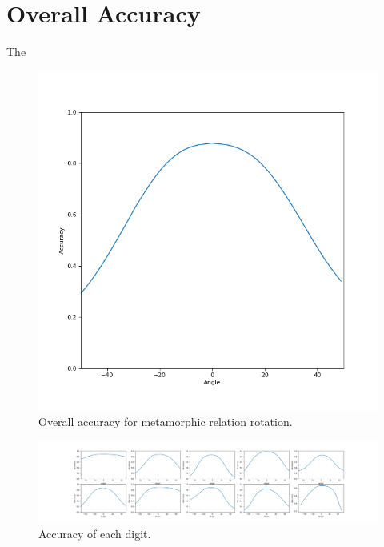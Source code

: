 \section{Overall Accuracy}
The 
    \begin{figure}[!htb]
        \begin{center}
          \includegraphics[scale=0.6]{chapters/results/CNN/Rotate/acc.png}
          \caption{Overall accuracy for metamorphic relation rotation.}
          \label{fig:Rotate 1}
        \end{center}
    \end{figure}
    
\clearpage
    \begin{figure}[!htb]
    \centering
      \includegraphics[width=\linewidth]{chapters/results/CNN/Rotate/accAll.png}
      \caption{Accuracy of each digit.}
      \label{fig: Shading}
    \end{figure}
        
